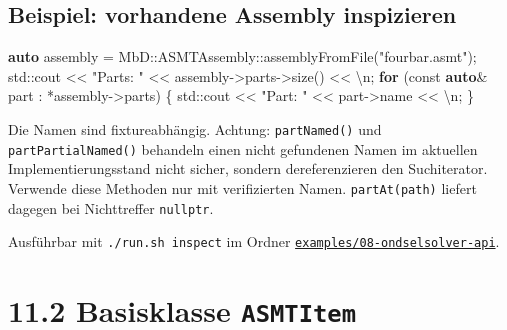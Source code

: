 \documentclass[
  12pt
]{book}
\newenvironment{Shaded}{}{}
\newcommand{\AttributeTok}[1]{\textcolor[rgb]{0.49,0.56,0.16}{#1}}
\newcommand{\BuiltInTok}[1]{\textcolor[rgb]{0.00,0.50,0.00}{#1}}
\newcommand{\CharTok}[1]{\textcolor[rgb]{0.25,0.44,0.63}{#1}}
\newcommand{\ControlFlowTok}[1]{\textcolor[rgb]{0.00,0.44,0.13}{\textbf{#1}}}
\newcommand{\KeywordTok}[1]{\textcolor[rgb]{0.00,0.44,0.13}{\textbf{#1}}}
\newcommand{\NormalTok}[1]{#1}
\newcommand{\OperatorTok}[1]{\textcolor[rgb]{0.40,0.40,0.40}{#1}}
\newcommand{\SpecialCharTok}[1]{\textcolor[rgb]{0.25,0.44,0.63}{#1}}
\newcommand{\StringTok}[1]{\textcolor[rgb]{0.25,0.44,0.63}{#1}}
\begin{document}
\hypertarget{beispiel-vorhandene-assembly-inspizieren}{%
\subsection*{Beispiel: vorhandene Assembly
inspizieren}\label{beispiel-vorhandene-assembly-inspizieren}}

\begin{Shaded}
\begin{Highlighting}[]
\KeywordTok{auto}\NormalTok{ assembly }\OperatorTok{=}\NormalTok{ MbD}\OperatorTok{::}\NormalTok{ASMTAssembly}\OperatorTok{::}\NormalTok{assemblyFromFile}\OperatorTok{(}\StringTok{"fourbar.asmt"}\OperatorTok{);}
\BuiltInTok{std::}\NormalTok{cout }\OperatorTok{\textless{}\textless{}} \StringTok{"Parts: "} \OperatorTok{\textless{}\textless{}}\NormalTok{ assembly}\OperatorTok{{-}\textgreater{}}\NormalTok{parts}\OperatorTok{{-}\textgreater{}}\NormalTok{size}\OperatorTok{()} \OperatorTok{\textless{}\textless{}} \CharTok{\textquotesingle{}}\SpecialCharTok{\textbackslash{}n}\CharTok{\textquotesingle{}}\OperatorTok{;}
\ControlFlowTok{for} \OperatorTok{(}\AttributeTok{const} \KeywordTok{auto}\OperatorTok{\&}\NormalTok{ part }\OperatorTok{:} \OperatorTok{*}\NormalTok{assembly}\OperatorTok{{-}\textgreater{}}\NormalTok{parts}\OperatorTok{)} \OperatorTok{\{}
    \BuiltInTok{std::}\NormalTok{cout }\OperatorTok{\textless{}\textless{}} \StringTok{"Part: "} \OperatorTok{\textless{}\textless{}}\NormalTok{ part}\OperatorTok{{-}\textgreater{}}\NormalTok{name }\OperatorTok{\textless{}\textless{}} \CharTok{\textquotesingle{}}\SpecialCharTok{\textbackslash{}n}\CharTok{\textquotesingle{}}\OperatorTok{;}
\OperatorTok{\}}
\end{Highlighting}
\end{Shaded}

Die Namen sind fixtureabhängig. Achtung: \texttt{partNamed()} und
\texttt{partPartialNamed()} behandeln einen nicht gefundenen Namen im
aktuellen Implementierungsstand nicht sicher, sondern dereferenzieren
den Suchiterator. Verwende diese Methoden nur mit verifizierten Namen.
\texttt{partAt(path)} liefert dagegen bei Nichttreffer \texttt{nullptr}.

Ausführbar mit \texttt{./run.sh\ inspect} im Ordner
\href{./examples/08-ondselsolver-api/README.md}{\texttt{examples/08-ondselsolver-api}}.

\hypertarget{basisklasse-asmtitem}{%
\section{\texorpdfstring{{11.2} Basisklasse
\texttt{ASMTItem}}{11.2 Basisklasse ASMTItem}}\label{basisklasse-asmtitem}}
\end{document}
